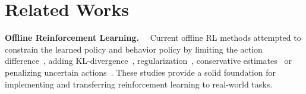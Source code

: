 






\section{Related Works}
\textbf{Offline Reinforcement Learning.}\ \
Current offline RL methods attempted to constrain the learned policy and behavior policy by limiting the action difference~\citep{fujimoto2019off}, adding KL-divergence~\citep{yang2021believe, nair2020awac,peng2019advantage,wu2019behavior}, regularization~\citep{kumar2019stabilizing}, conservative estimates~\citep{yang2023flow,ma2021offline, kumar2020conservative,ma2021conservative} or penalizing uncertain actions~\citep{janner2019trust,yu2021combo,kidambi2020morel}.
These studies provide a solid foundation for implementing and transferring reinforcement learning to real-world tasks.

